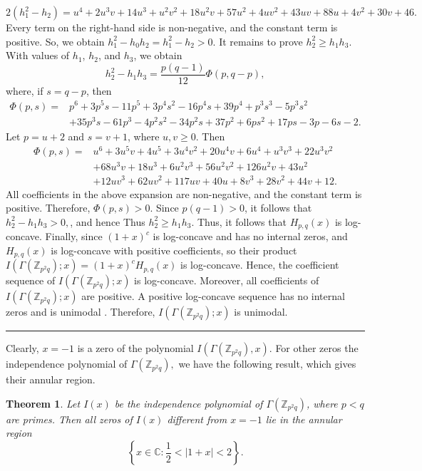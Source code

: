 \documentclass[12pt,twoside]{article}
\newtheorem{theorem}{Theorem}[section]
\renewenvironment{proof}{{\noindent\bfseries Proof.}}{\qed}
\def\qed{\nolinebreak\hfill\rule{.2cm}{.2cm}\par\addvspace{.5cm}}
\begin{document}
\begin{proof}
	$$
	2(h_1^2-h_2)
	=
	u^4+2u^3v+14u^3+u^2v^2+18u^2v+57u^2
	+4uv^2+43uv+88u+4v^2+30v+46.
	$$
	Every term on the right-hand side is non-negative, and the constant term is positive. So, we obtain 
	$
	h_1^2-h_0h_2=h_1^2-h_2>0.
	$	
	It remains to prove $h_2^2\geq h_1h_3$. With values of $h_1$, $h_2$, and $h_3$, we obtain
	$$
	h_2^2-h_1h_3
	=
	\frac{p(q-1)}{12}\Phi(p,q-p),
	$$
	where, if $s=q-p$, then
	$$
	\begin{aligned}
		\Phi(p,s)=&
		p^6+3p^5s-11p^5+3p^4s^2-16p^4s+39p^4+p^3s^3-5p^3s^2  \\
		&+35p^3s-61p^3-4p^2s^2-34p^2s+37p^2+6ps^2+17ps-3p-6s-2.
	\end{aligned}
	$$
	Let $p=u+2$ and $s=v+1$, where $u,v\geq 0$. Then
	$$
	\begin{aligned}
		\Phi(p,s)=&
		u^6+3u^5v+4u^5+3u^4v^2+20u^4v+6u^4+u^3v^3+22u^3v^2\\
		&+68u^3v+18u^3+6u^2v^3+56u^2v^2+126u^2v+43u^2\\
		&+12uv^3+62uv^2+117uv+40u+8v^3+28v^2+44v+12.
	\end{aligned}
	$$
	All coefficients in the above expansion are non-negative, and the constant term is positive. Therefore, $\Phi(p,s)>0$. Since $p(q-1)>0$, it follows that
	$
	h_2^2-h_1h_3>0,
	$, and hence 
	Thus
	$
	h_2^2\geq h_1h_3.
	$
	Thus, it follows that $H_{p,q}(x)$ is log-concave. Finally, since $(1+x)^c$ is log-concave and has no internal zeros, and  $H_{p,q}(x)$ is log-concave with positive coefficients, so their product
	$
	I(\varGamma(\mathbb{Z}_{p^2q});x)=(1+x)^cH_{p,q}(x)
	$
	is log-concave. Hence, the coefficient sequence of $I(\varGamma(\mathbb{Z}_{p^2q});x)$ is log-concave. Moreover, all coefficients of $I(\varGamma(\mathbb{Z}_{p^2q});x)$ are positive. A positive log-concave sequence has no internal zeros and is unimodal \cite{stanley}. Therefore, $I(\varGamma(\mathbb{Z}_{p^2q});x)$ is unimodal.
\end{proof} 


Clearly, $x=-1$ is a zero of the polynomial $I(\varGamma(\mathbb{Z}_{p^2q}), x)$. For other zeros the independence polynomial of $\varGamma(\mathbb{Z}_{p^2q}),$ we have the following result, which gives their annular region.
\begin{theorem}
	Let $I(x)$ be the independence polynomial of $\varGamma(\mathbb{Z}_{p^{2}q})$, where $p<q$ are primes. Then  all zeros of $I(x)$ different from $x=-1$ lie in the annular region
	$$
	\left\{x\in\mathbb{C}:\frac{1}{2}<|1+x|<2\right\}.
	$$
\end{theorem}
\end{document}
